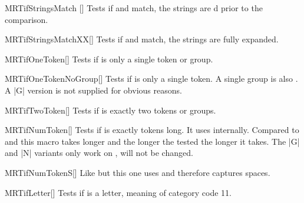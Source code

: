 \begin{describemacroTF}{MRTifStringsMatch}%
  []
  Tests if  and  match, the strings are
  d prior to the comparison.
\end{describemacroTF}

\begin{describemacroTF}[G]{MRTifStringsMatchXX}[]
  Tests if  and  match, the strings are fully
  expanded.
\end{describemacroTF}

\begin{describemacroTF}[G,N,GN]{MRTifOneToken}[]
  Tests if  is only a single token or group.
\end{describemacroTF}

\begin{describemacroTF}[N]{MRTifOneTokenNoGroup}[]
  Tests if  is only a single token. A single group is also
  . A |G| version is not supplied for obvious reasons.
\end{describemacroTF}

\begin{describemacroTF}[G,N,GN]{MRTifTwoToken}[]
  Tests if  is exactly two tokens or groups.
\end{describemacroTF}

\begin{describemacroTF}[G,N,GN]{MRTifNumToken}[]
  Tests if  is exactly  tokens long. It uses
   internally. Compared to  and
   this macro takes longer and the longer the tested
   the longer it takes. The |G| and |N| variants only work on
  ,  will not be changed.
\end{describemacroTF}

\begin{describemacroTF}[G,N,GN]{MRTifNumTokenS}[]
  Like  but this one uses  and therefore
  captures spaces.
\end{describemacroTF}

\begin{describemacroTF}[G,N,GN]{MRTifLetter}[]
  Tests if  is a letter, meaning of category code 11.
\end{describemacroTF}

